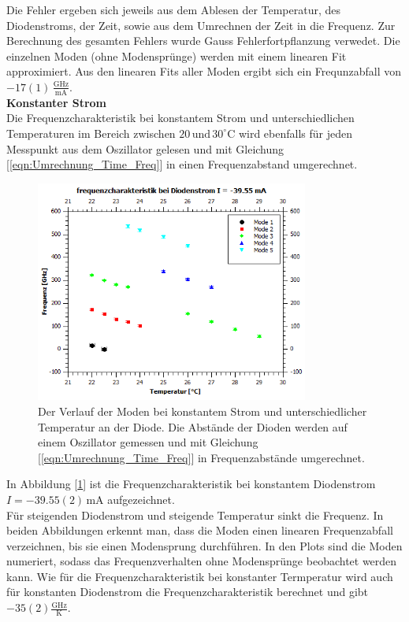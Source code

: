 \documentclass[a4paper,10pt]{scrartcl} %
\begin{document}
Die Fehler ergeben sich jeweils aus dem Ablesen der Temperatur, des Diodenstroms, der Zeit, sowie aus dem Umrechnen der Zeit in die Frequenz. Zur Berechnung des gesamten Fehlers wurde Gauss Fehlerfortpflanzung verwedet. Die einzelnen Moden (ohne Modensprünge) werden mit einem linearen Fit approximiert. Aus den linearen Fits aller Moden ergibt sich ein Frequnzabfall von $-17(1) \,\frac{\text{GHz}}{\text{mA}}$.
\\
\textbf{Konstanter Strom}\\
Die Frequenzcharakteristik bei konstantem Strom und unterschiedlichen Temperaturen im Bereich zwischen $20 \, \text{und} \, 30 ^\circ{\text{C}}$ wird ebenfalls für jeden Messpunkt aus dem Oszillator gelesen und mit Gleichung [\ref{eqn:Umrechnung_Time_Freq}] in einen Frequenzabstand umgerechnet.
\begin{figure}
\centering
\includegraphics[width=0.8\textwidth]{Bilder/Frequenzchar_2.png}
\caption{Der Verlauf der Moden bei konstantem Strom  und unterschiedlicher Temperatur an der Diode. Die Abstände der Dioden werden auf einem Oszillator gemessen und mit Gleichung [\ref{eqn:Umrechnung_Time_Freq}] in Frequenzabstände umgerechnet.}
\label{fig:2_const_I}
\end{figure}
In Abbildung [\ref{fig:2_const_I}] ist die Frequenzcharakteristik bei konstantem Diodenstrom $I = -39.55(2) \,\text{mA}$ aufgezeichnet.\\
Für steigenden Diodenstrom und steigende Temperatur sinkt die Frequenz. In beiden Abbildungen erkennt man, dass die Moden einen linearen Frequenzabfall verzeichnen, bis sie einen Modensprung durchführen. In den Plots sind die Moden numeriert, sodass das Frequenzverhalten ohne Modensprünge beobachtet werden kann. Wie für die Frequenzcharakteristik bei konstanter Termperatur wird auch für konstanten Diodenstrom die Frequenzcharakteristik berechnet und gibt $-35(2) \frac{\text{GHz}}{\text{K}}$.
\end{document}
